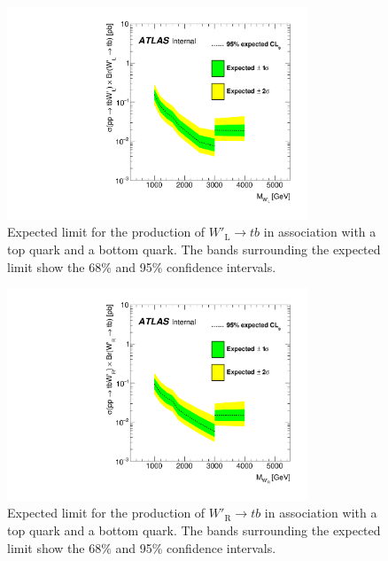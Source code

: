 \begin{figure}[H]
  \centering
  \includegraphics[width=0.8\textwidth]{images/ProfileLHFit/XSUpperLimits_Wp-LH.pdf}
  \caption{Expected limit for the production of $W'_{\text{L}}{\rightarrow}tb$ in association with a top quark and a bottom quark. The bands surrounding the expected limit show the 68\% and 95\% confidence intervals.}
  \label{fig:XSLimits_WpLH}
\end{figure}


\begin{figure}[H]
  \centering
  \includegraphics[width=0.8\textwidth]{images/ProfileLHFit/XSUpperLimits_Wp-RH.pdf}
  \caption{Expected limit for the production of $W'_{\text{R}}{\rightarrow}tb$ in association with a top quark and a bottom quark. The bands surrounding the expected limit show the 68\% and 95\% confidence intervals.}
  \label{fig:XSLimits_WpRH}
\end{figure}
